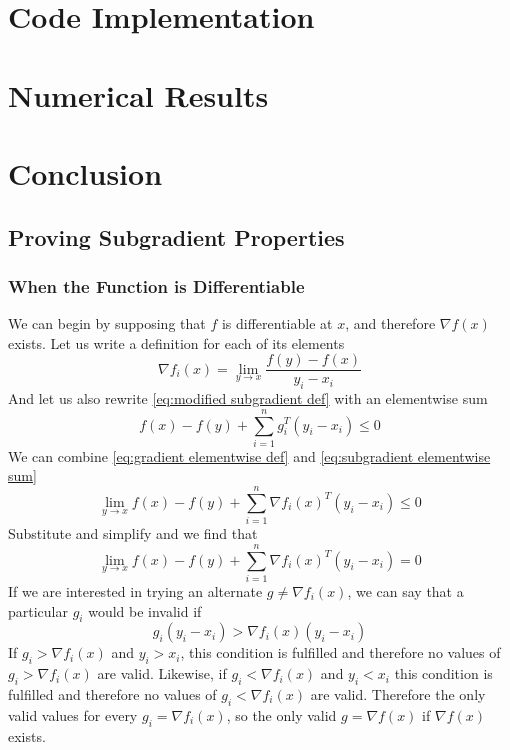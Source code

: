 \documentclass[journal,onecolumn]{IEEEtran}
\begin{document}
\section{Code Implementation}\label{sec:code}

\section{Numerical Results}\label{sec:results}

\section{Conclusion}\label{sec:conclusion}

\appendix
\subsection{Proving Subgradient Properties}\label{sec:subgradient properties proofs}
\subsubsection{When the Function is Differentiable}
We can begin by supposing that \(f\) is differentiable at \(x\), and therefore \(\nabla f(x)\) exists. Let us write a definition for each of its elements
\begin{equation}\label{eq:gradient elementwise def}
    \nabla f_i(x) = \lim_{y \rightarrow x} \frac{f(y)-f(x)}{y_i-x_i}
\end{equation}
And let us also rewrite \eqref{eq:modified subgradient def} with an elementwise sum
\begin{equation}\label{eq:subgradient elementwise sum}
f(x) - f(y)+ \sum^{n}_{i=1} g^T_i(y_i-x_i) \leq 0
\end{equation}
We can combine \eqref{eq:gradient elementwise def} and \eqref{eq:subgradient elementwise sum}
\begin{equation}
\lim_{y \rightarrow x} f(x) - f(y)+ \sum^{n}_{i=1} \nabla f_i(x)^T(y_i-x_i) \leq 0
\end{equation}
Substitute and simplify and we find that
\begin{equation}
\lim_{y \rightarrow x} f(x) - f(y)+ \sum^{n}_{i=1} \nabla f_i(x)^T(y_i-x_i) = 0
\end{equation}
If we are interested in trying an alternate \(g \neq \nabla f_i(x)\), we can say that a particular \(g_i\) would be invalid if
\begin{equation}\label{eq:differentiable cookie}
g_i(y_i-x_i) > \nabla f_i(x)(y_i-x_i)
\end{equation}
If \(g_i > \nabla f_i(x)\) and \(y_i > x_i\), this condition is fulfilled and therefore no values of \(g_i > \nabla f_i(x)\) are valid. Likewise, if \(g_i < \nabla f_i(x)\) and \(y_i < x_i\) this condition is fulfilled and therefore no values of \(g_i < \nabla f_i(x)\) are valid. Therefore the only valid values for every \(g_i = \nabla f_i(x)\), so the only valid \(g = \nabla f(x)\) if \(\nabla f(x)\) exists.
\end{document}
